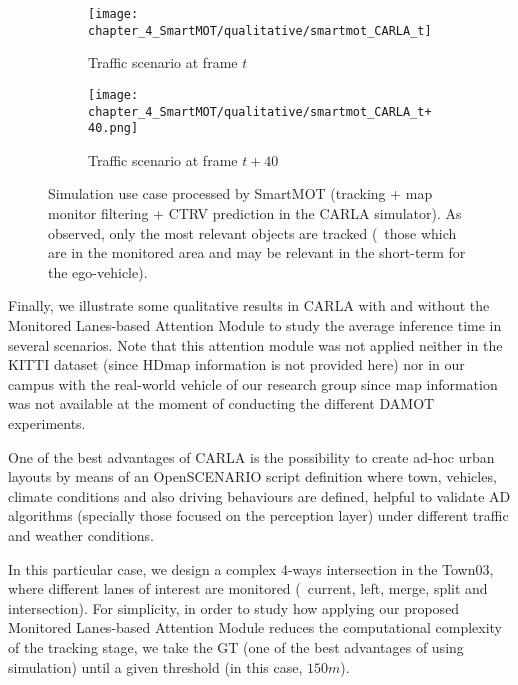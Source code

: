 \begin{figure}[]
	\begin{subfigure}{\textwidth}
		\texttt{[image: chapter\_4\_SmartMOT/qualitative/smartmot\_CARLA\_t]}
		\label{subfig:chapter_4_SmartMOT/qualitative/smartmot_CARLA_t}
		\caption{Traffic scenario at frame $t$}
	\end{subfigure}
	\begin{subfigure}{\textwidth}
		\texttt{[image: chapter\_4\_SmartMOT/qualitative/smartmot\_CARLA\_t+40.png]}
		\label{subfig:chapter_8_Applications/qualitative/smartmot_CARLA_t+40}
		\caption{Traffic scenario at frame $t+40$}
	\end{subfigure}
	\captionsetup{justification=justified}
	\caption[Simulation use case processed by SmartMOT (tracking + map monitor filtering + \ac{CTRV} prediction in the \ac{CARLA} simulator)]{Simulation use case processed by SmartMOT (tracking + map monitor filtering + \ac{CTRV} prediction in the \ac{CARLA} simulator). As observed, only the most relevant objects are tracked (\ie \ those which are in the monitored area and may be relevant in the short-term for the ego-vehicle).}
	\label{fig:chapter_4_SmartMOT/SmartMOT_CARLA}
\end{figure}

Finally, we illustrate some qualitative results in \ac{CARLA} with and without the Monitored Lanes-based Attention Module to study the average inference time in several scenarios. Note that this attention module was not applied neither in the KITTI dataset (since \ac{HDmap} information is not provided here) nor in our campus with the real-world vehicle of our research group since map information was not available at the moment of conducting the different \ac{DAMOT} experiments. 

One of the best advantages of \ac{CARLA} is the possibility to create ad-hoc urban layouts by means of an OpenSCENARIO \cite{jullien2009openscenario} script definition where town, vehicles, climate conditions and also driving behaviours are defined, helpful to validate \ac{AD} algorithms (specially those focused on the perception layer) under different traffic and weather conditions. 

In this particular case, we design a complex 4-ways intersection in the Town03, where different lanes of interest are monitored (\ie \ current, left, merge, split and intersection). For simplicity, in order to study how applying our proposed Monitored Lanes-based Attention Module reduces the computational complexity of the tracking stage, we take the \ac{GT} (one of the best advantages of using simulation) until a given threshold (in this case, $150m$). 

